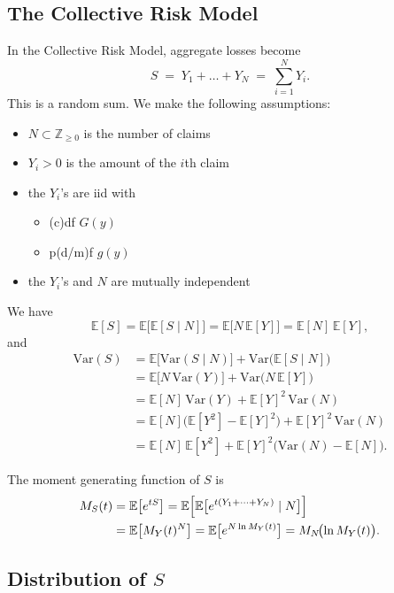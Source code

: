 \documentclass[11pt]{article}
\newcommand{\noi}{\noindent}
\begin{document}
\subsection{The Collective Risk Model}
\noi In the Collective Risk Model, aggregate losses become
\[
S \;=\; Y_{1} + \dots + Y_{N} \;=\; \sum_{i=1}^{N} Y_{i}.
\]
\noi This is a random sum. We make the following assumptions:
\begin{itemize}
  \item \(N \subset \mathbb{Z}_{\ge0}\) is the number of claims
  \item \(Y_i > 0\) is the amount of the \(i\)th claim
  \item the \(Y_i\)'s are iid with
    \begin{itemize}
      \item (c)df \(G(y)\)
      \item p(d/m)f \(g(y)\)
    \end{itemize}
  \item the \(Y_i\)'s and \(N\) are mutually independent
\end{itemize} \phantom{i}

\noi We have
\[
\mathbb{E}[S]
= \mathbb{E}\bigl[\mathbb{E}[S\mid N]\bigr]
= \mathbb{E}\bigl[N\,\mathbb{E}[Y]\bigr]
= \mathbb{E}[N]\,\mathbb{E}[Y],
\]
and
\[
\begin{aligned}
\text{Var}(S)
&= \mathbb{E}\bigl[\text{Var}(S\mid N)\bigr]
  + \text{Var}\bigl(\mathbb{E}[S\mid N]\bigr)\\
&= \mathbb{E}\bigl[N\,\text{Var}(Y)\bigr]
  + \text{Var}\bigl(N\,\mathbb{E}[Y]\bigr)\\
&= \mathbb{E}[N]\,\text{Var}(Y)
  + \mathbb{E}[Y]^2\,\text{Var}(N)\\
&= \mathbb{E}[N]\bigl(\mathbb{E}[Y^2]-\mathbb{E}[Y]^2\bigr)
  + \mathbb{E}[Y]^2\,\text{Var}(N)\\
&= \mathbb{E}[N]\,\mathbb{E}[Y^2]
  + \mathbb{E}[Y]^2\bigl(\text{Var}(N)-\mathbb{E}[N]\bigr).
\end{aligned}
\]

\noi The moment generating function of \(S\) is
\[
\begin{aligned}
M_S(t)
&= \mathbb{E}\bigl[e^{tS}\bigr]
= \mathbb{E}\Bigl[\mathbb{E}\bigl[e^{t(Y_1 + \dots + Y_N)}\mid N\bigr]\Bigr]\\
&= \mathbb{E}\bigl[M_Y(t)^N\bigr]
= \mathbb{E}\bigl[e^{N\ln M_Y(t)}\bigr]
= M_N\!\bigl(\ln M_Y(t)\bigr).
\end{aligned}
\]

\subsection{Distribution of \(S\)}
\end{document}
